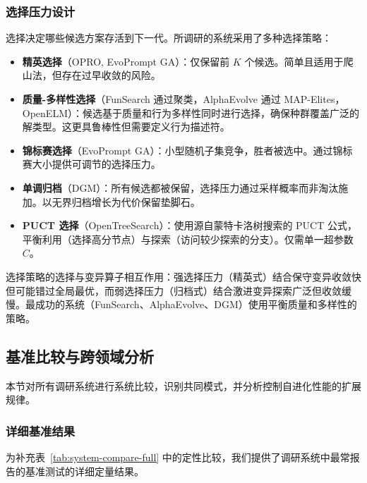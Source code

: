 \subsubsection{选择压力设计}

选择决定哪些候选方案存活到下一代。所调研的系统采用了多种选择策略：

\begin{itemize}
    \item \textbf{精英选择}（OPRO, EvoPrompt GA）：仅保留前 $K$ 个候选。简单且适用于爬山法，但存在过早收敛的风险。
    \item \textbf{质量-多样性选择}（FunSearch 通过聚类，AlphaEvolve 通过 MAP-Elites，OpenELM）：候选基于质量和行为多样性同时进行选择，确保种群覆盖广泛的解类型。这更具鲁棒性但需要定义行为描述符。
    \item \textbf{锦标赛选择}（EvoPrompt GA）：小型随机子集竞争，胜者被选中。通过锦标赛大小提供可调节的选择压力。
    \item \textbf{单调归档}（DGM）：所有候选都被保留，选择压力通过采样概率而非淘汰施加。以无界归档增长为代价保留垫脚石。
    \item \textbf{PUCT 选择}（OpenTreeSearch）：使用源自蒙特卡洛树搜索的 PUCT 公式，平衡利用（选择高分节点）与探索（访问较少探索的分支）。仅需单一超参数 $C$。
\end{itemize}

选择策略的选择与变异算子相互作用：强选择压力（精英式）结合保守变异收敛快但可能错过全局最优，而弱选择压力（归档式）结合激进变异探索广泛但收敛缓慢。最成功的系统（FunSearch、AlphaEvolve、DGM）使用平衡质量和多样性的策略。


\subsection{基准比较与跨领域分析}
\label{sec:ch4-benchmark}

本节对所有调研系统进行系统比较，识别共同模式，并分析控制自进化性能的扩展规律。

\subsubsection{详细基准结果}

为补充表~\ref{tab:system-compare-full} 中的定性比较，我们提供了调研系统中最常报告的基准测试的详细定量结果。

